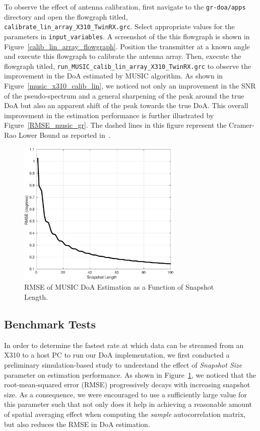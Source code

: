 \documentclass[a4paper, 11pt]{article}
\begin{document}
To observe the effect of antenna calibration, first navigate to the \texttt{gr-doa/apps} directory and open the flowgraph titled, \texttt{calibrate\_lin\_array\_X310\_TwinRX.grc}. Select appropriate values for the parameters in \texttt{input\_variables}. A screenshot of the this flowgraph is shown in Figure~\ref{calib_lin_array_flowgraph}. Position the transmitter at a known angle and execute this flowgraph to calibrate the antenna array. Then, execute the flowgraph titled, \texttt{run\_MUSIC\_calib\_lin\_array\_X310\_TwinRX.grc} to observe the improvement in the DoA estimated by MUSIC algorithm. As shown in Figure~\ref{music_x310_calib_lin}, we noticed not only an improvement in the SNR of the pseudo-spectrum and a general sharpening of the peak around the true DoA but also an apparent shift of the peak towards the true DoA. This overall improvement in the estimation performance is further illustrated by Figure~\ref{RMSE_music_gr}. The dashed lines in this figure represent the Cramer-Rao Lower Bound as reported in~\cite{stoica1989}. 
\begin{figure}[ht!]
    \centering
    \includegraphics[width=0.7\textwidth]{figures/ss_len_rmse.eps}
    \caption{RMSE of MUSIC DoA Estimation as a Function of Snapshot Length.}
    \label{music_sim_ss}
\end{figure}

\subsection*{Benchmark Tests}
In order to determine the fastest rate at which data can be streamed from an X310 to a host PC to run our DoA implementation, we first conducted a preliminary simulation-based study to understand the effect of \textit{Snapshot Size} parameter on estimation performance. As shown in Figure~\ref{music_sim_ss}, we noticed that the root-mean-squared error (RMSE) progressively decays with increasing snapshot size. As a consequence, we were encouraged to use a sufficiently large value for this parameter such that not only does it help in achieving a reasonable amount of spatial averaging effect when computing the \textit{sample} autocorrelation matrix, but also reduces the RMSE in DoA estimation.
\end{document}
